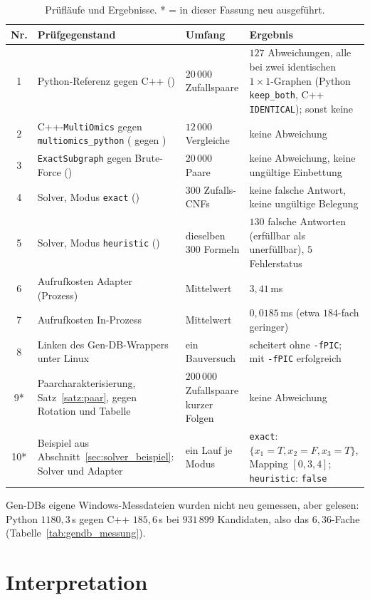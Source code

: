\begin{table}[!ht]
	\centering
	\small
	\begin{tabularx}{\textwidth}{@{}cL{5.0cm}L{2.8cm}Y@{}}
		\toprule
		Nr. & Prüfgegenstand & Umfang & Ergebnis \\
		 & Python-Referenz gegen C++ () & $20\,000$ Zufallspaare & $127$ Abweichungen, alle bei zwei identischen $1{\times}1$-Graphen (Python \texttt{keep\_both}, C++ \texttt{IDENTICAL}); sonst keine \\
		2 & C++-\texttt{MultiOmics} gegen \texttt{multiomics\_python} ( gegen ) & $12\,000$ Vergleiche & keine Abweichung \\
		3 & \texttt{ExactSubgraph} gegen Brute-Force () & $20\,000$ Paare & keine Abweichung, keine ungültige Einbettung \\
		4 & Solver, Modus \texttt{exact} () & $300$ Zufalls-CNFs & keine falsche Antwort, keine ungültige Belegung \\
		5 & Solver, Modus \texttt{heuristic} () & dieselben $300$ Formeln & $130$ falsche Antworten (erfüllbar als unerfüllbar), $5$ Fehlerstatus \\
		6 & Aufrufkosten Adapter (Prozess) & Mittelwert & $3{,}41$\,ms \\
		7 & Aufrufkosten In-Prozess & Mittelwert & $0{,}0185$\,ms (etwa $184$-fach geringer) \\
		8 & Linken des Gen-DB-Wrappers unter Linux & ein Bauversuch & scheitert ohne \texttt{-fPIC}; mit \texttt{-fPIC} erfolgreich \\
		9* & Paarcharakterisierung, Satz~\ref{satz:paar}, gegen Rotation und Tabelle & $200\,000$ Zufallspaare kurzer Folgen & keine Abweichung \\
		10* & Beispiel aus Abschnitt~\ref{sec:solver_beispiel}: Solver und Adapter & ein Lauf je Modus & \texttt{exact}: $\{x_1{=}T,x_2{=}F,x_3{=}T\}$, Mapping $[0,3,4]$; \texttt{heuristic}: \texttt{false} \\
		\bottomrule
	\end{tabularx}
	\caption{Prüfläufe und Ergebnisse. * = in dieser Fassung neu ausgeführt.}
	\label{tab:pruefung}
\end{table}

Gen-DBs eigene Windows-Messdateien wurden nicht neu gemessen, aber gelesen: Python $1180{,}3$\,s gegen C++ $185{,}6$\,s bei $931\,899$ Kandidaten, also das $6{,}36$-Fache (Tabelle~\ref{tab:gendb_messung}).

\section{Interpretation}

